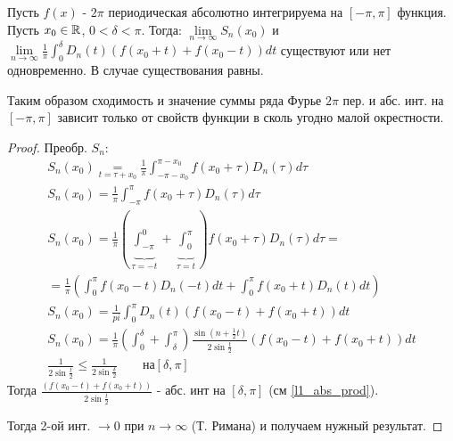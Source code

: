 \documentclass{article}
\begin{document}
\begin{theorem}
  Пусть $f(x)$ - $2\pi$ периодическая абсолютно интегрируема на $[-\pi,\pi]$ функция.
  Пусть $x_0\in\mathbb{R}$, $0<\delta<\pi$. Тогда: $\lim\limits_{n\to\infty}S_n(x_0)$ и
  $\lim\limits_{n\to\infty}\frac{1}{\pi}\int_{0}^{\delta}D_n(t)(f(x_0+t)+f(x_0-t))dt$
  существуют или нет одновременно. В случае существования равны.
\end{theorem}
\begin{remark}
  Таким образом сходимость и значение суммы ряда Фурье $2\pi$ пер. и абс. инт.
  на $[-\pi,\pi]$ зависит только от свойств функции в сколь угодно малой окрестности.
\end{remark}
\begin{proof}
  Преобр. $S_n$:
  \begin{gather*}
    S_n(x_0)\underset{t=\tau+x_0}{=}\frac{1}{\pi}\int_{-\pi-x_0}^{\pi-x_0}f(x_0+\tau)D_n(\tau)d\tau \\ 
    S_n(x_0)=\frac{1}{\pi}\int_{-\pi}^{\pi}f(x_0+\tau)D_n(\tau)d\tau \\ 
    S_n(x_0)=\frac{1}{\pi}(\underbrace{\int_{-\pi}^{0}}_{\tau=-t}+\underbrace{\int_{0}^{\pi}}_{\tau=t})f(x_0+\tau)D_n(\tau)d\tau = \\ 
    =\frac{1}{\pi}(\int_{0}^{\pi}f(x_0-t)D_n(-t)dt + \int_{0}^{\pi}f(x_0+t)D_n(t)dt) \\ 
    S_n(x_0)=\frac{1}{pi}\int_{0}^{\pi}D_n(t)(f(x_0-t)+f(x_0+t))dt \\ 
    S_n(x_0)=\frac{1}{\pi}(\int_{0}^{\delta}+\int_{\delta}^{\pi})\frac{\sin(n+\frac{1}{2}t)}{2\sin \frac{t}{2}}(f(x_0-t)+f(x_0+t))dt \\
    \frac{1}{2\sin\frac{t}{2}} \le \frac{1}{2\sin \frac{\delta}{2}} \qquad \text{на} [\delta,\pi]
  \end{gather*}
  Тогда $\frac{(f(x_0-t)+f(x_0+t))}{2\sin \frac{t}{2}}$ - абс. инт на $[\delta,\pi]$ (см \ref{l1_abs_prod}).

  Тогда 2-ой инт. $\to0$ при $n\to\infty$ (Т. Римана) и получаем нужный результат.
\end{proof}
\end{document}
